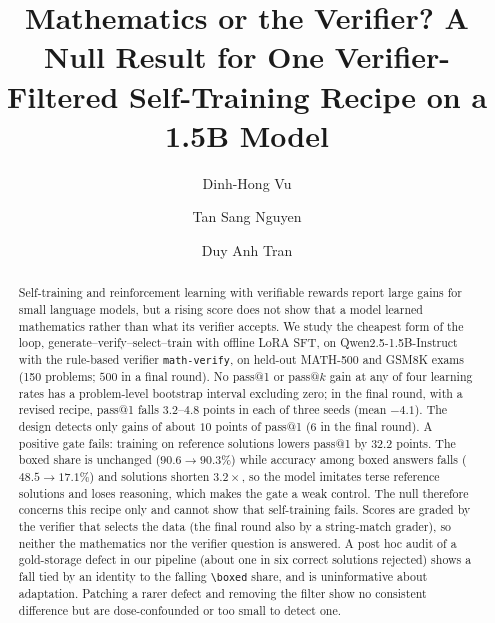 \documentclass[runningheads]{llncs}
\begin{document}
\title{Mathematics or the Verifier? A Null Result for One
Verifier-Filtered Self-Training Recipe on a 1.5B Model}


\author{Dinh-Hong Vu \and Tan Sang Nguyen \and Duy Anh Tran}

\maketitle

\begin{abstract}
Self-training and reinforcement learning with verifiable rewards report large
gains for small language models, but a rising score does not show that a
model learned mathematics rather than what its verifier accepts. We study the
cheapest form of the loop, generate--verify--select--train with offline LoRA
SFT, on Qwen2.5-1.5B-Instruct with the rule-based verifier
\texttt{math-verify}, on held-out MATH-500 and GSM8K exams (150 problems; $500$
in a final round). No pass@1 or pass@$k$ gain at any of four learning rates has a
problem-level bootstrap interval excluding zero; in the final round, with a revised
recipe, pass@1 falls $3.2$--$4.8$ points in each of three seeds (mean $-4.1$). The
design detects only gains of about $10$ points of pass@1 ($6$ in the final round).
A positive gate fails: training on reference solutions lowers pass@1 by $32.2$
points. The boxed share is unchanged ($90.6\to90.3\%$) while accuracy among boxed answers
falls ($48.5\to17.1\%$) and solutions shorten $3.2\times$, so the model imitates terse
reference solutions and loses reasoning, which makes the gate a weak control. The null therefore concerns this recipe only and cannot show that
self-training fails. Scores are graded by the verifier that selects the data (the
final round also by a string-match grader), so neither the mathematics nor the
verifier question is answered. A post hoc audit of a gold-storage defect in our
pipeline (about one in six correct solutions rejected) shows a fall tied by an identity to the
falling \verb|\boxed| share, and is uninformative about adaptation. Patching a rarer
defect and removing the filter show no consistent difference but are
dose-confounded or too small to detect one.

\end{abstract}
\end{document}
